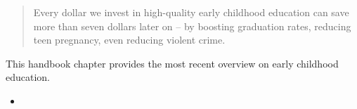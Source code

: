 \begin{frame}
\begin{quote}\Large
Every dollar we invest in high-quality early childhood education can save more than seven dollars later on -- by boosting graduation rates, reducing teen pregnancy, even reducing violent crime.
\end{quote}
\end{frame}
\begin{frame}\begin{figure}
\end{figure}\end{frame}
\begin{frame}
This handbook chapter provides the most recent overview on early childhood education.
\begin{itemize}
\item {}
\end{itemize}
\end{frame}
